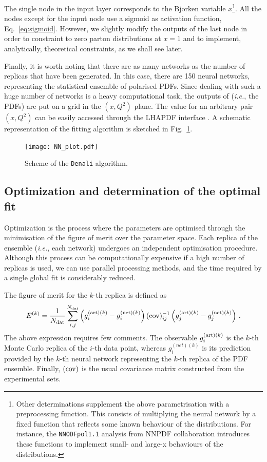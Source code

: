 The single node in the input layer corresponds to the Bjorken variable $x$\footnote{\footnotesize{Other determinations supplement the above parametrisation with a preprocessing function. This consists of multiplying the neural network by a fixed function that reflects some known behaviour of the distributions. For instance, the \texttt{NNODFpol1.1} analysis from NNPDF collaboration \cite{Nocera:2014gqa} introduces these functions to implement small- and large-x behaviours of the distributions.}}. All the nodes except for the input node use a sigmoid as activation function, Eq.~\eqref{eq:sigmoid}. However, we slightly modify the outputs of the last node in order to constraint to zero parton distributions at $x=1$ and to implement, analytically, theoretical constraints, as we shall see later.%

Finally, it is worth noting that there are as many networks as the number of replicas that have been generated. In this case, there are 150 neural networks, representing the statistical ensemble of polarised PDFs. Since dealing with such a huge number of networks is a heavy computational task, the outputs of (\textit{i.e.}, the PDFs) are put on a grid in the $(x,Q^2)$ plane. The value for an arbitrary pair $(x,Q^2)$ can be easily accessed through the LHAPDF interface \cite{Buckley:2014ana}. A schematic representation of the fitting algorithm is sketched in Fig.~\ref{fig:NN_plot}.
\begin{figure}[t]
  \centering
  \texttt{[image: NN\_plot.pdf]} 
  \caption{\small{Scheme of the \texttt{Denali} algorithm.}}
  \label{fig:NN_plot}
\end{figure}

\subsection*{Optimization and determination of the optimal fit}
Optimization is the process where the parameters are optimised through the minimisation of the figure of merit over the parameter space. Each replica of the ensemble (\textit{i.e.}, each network) undergoes an independent optimisation procedure. Although this process can be computationally expensive if a high number of replicas is used, we can use parallel processing methods, and the time required by a single global fit is considerably reduced.%

The figure of merit for the $k$-th replica is defined as
\begin{equation}
  E^{(k)} = \frac{1}{N_{\textrm{dat}}} \sum_{i,j}^{N_{\textrm{dat}}} \left( g_{i}^{\textrm{(art)}(k)} - g_{i}^{\textrm{(net)}(k)} \right) (\textrm{cov})^{-1}_{ij} \left( g_{j}^{\textrm{(art)}(k)} - g_{j}^{\textrm{(net)}(k)} \right) \,.
  \label{eq:EF_k}
\end{equation}
The above expression requires few comments. The observable $g_{i}^{\textrm{(art)}(k)}$ is the $k$-th Monte Carlo replica of the $i$-th data point, whereas $g_{i}^{(net)(k)}$ is its prediction provided by the $k$-th neural network representing the $k$-th replica of the PDF ensemble. Finally, $\textrm{(cov)}$ is the usual covariance matrix constructed from the experimental sets.%


